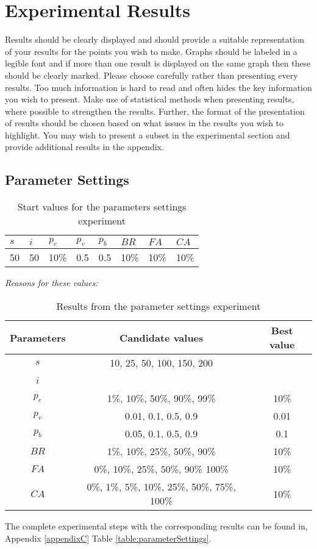\section{Experimental Results}

Results should be clearly displayed and should provide a suitable representation of your results for the points you wish to make. Graphs should be labeled in a legible font and if more than one result is displayed on the same graph then these should be clearly marked.   Please choose carefully rather than presenting every results. Too much information is hard to read and often hides the key information you wish to present. Make use of statistical methods when presenting results, where possible to strengthen the results.  Further, the format of the presentation of results should be chosen based on what issues in the results you wish to highlight. You may wish to present a subset in the experimental section and provide additional results in the appendix.

\subsection{Parameter Settings}
\label{subsec:parameterSettings_results}

\begin{table}[H]
	\centering
    \begin{tabular}{|l|l|l|l|l|l|l|l|}
 	\hline
 	$s$ & $i$ & $p_{e}$ & $p_{v}$ & $p_{b}$ & $BR$  & $FA$ & $CA$  \\
 	\hline
    50 & 50 & 10\% & 0.5 & 0.5 & 10\% & 10\%  & 10\%  \\
	\hline
    \end{tabular}
    \caption {Start values for the parameters settings experiment} \emph{\color{red} Reasons for these values:}
    \label{table:parameter_startvalues}
	\end{table}

	\begin{table}[H]
	\centering
    \begin{tabular}{|c|c||c|}
 	\hline
 	Parameters & Candidate values & Best value\\
 	\hline
    $s$ & 10, 25, 50, 100, 150, 200 & ~ \\
    $i$ & ~ & ~ \\
    $p_{e}$ & 1\%, 10\%, 50\%, 90\%, 99\% & 10\% \\
    $p_{v}$ & 0.01, 0.1, 0.5, 0.9 & 0.01  \\
    $p_{b}$ & 0.05, 0.1, 0.5, 0.9 & 0.1 \\
    $BR$ & 1\%, 10\%, 25\%, 50\%, 90\% & 10\% \\
    $FA$ & 0\%, 10\%, 25\%, 50\%, 90\% 100\% & 10\% \\
    $CA$ & 0\%, 1\%, 5\%, 10\%, 25\%, 50\%, 75\%, 100\% & 10\% \\
	\hline
    \end{tabular}
    \caption {Results from the parameter settings experiment}
    The complete experimental steps with the corresponding results can be found in, Appendix \ref{appendixC} Table \vref{table:parameterSettings}.
    \label{table:parameterSettings2}
	\end{table}

